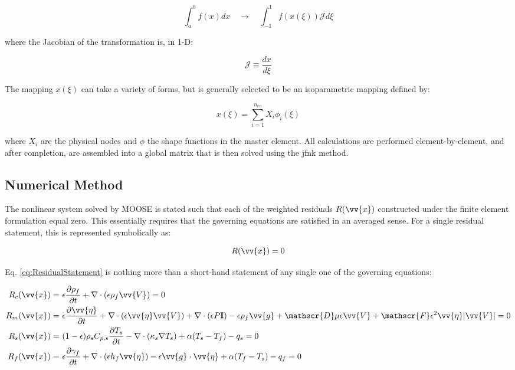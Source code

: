 \documentclass[10pt]{article}
\newcommand{\massconservationnlv}{\epsilon\frac{\partial\rho_f}{\partial t} + \nabla\cdot(\epsilon\rho_f\vv{V})=0}
\newcommand{\momentumconservationnlv}{\epsilon\frac{\partial\vv{\eta}}{\partial t}+\nabla\cdot(\epsilon\vv{\eta}\vv{V})+\nabla\cdot(\epsilon P\textbf{I})-\epsilon\rho_f\vv{g}+\mathscr{D}\mu\epsilon\vv{V}+\mathscr{F}\epsilon^2\vv{\eta}|\vv{V}|=0}
\newcommand{\fluidenergyconservationnlv}{\epsilon\frac{\partial \gamma_f}{\partial t}+\nabla\cdot(\epsilon h_f\vv{\eta})-\epsilon\vv{g}\cdot\vv{\eta}+\alpha(T_f-T_s)-q_f=0}
\newcommand{\solidenergyconservationnlv}{(1-\epsilon)\rho_sC_{p,s}\frac{\partial T_s}{\partial t}-\nabla\cdot(\kappa_s\nabla T_s)+\alpha(T_s-T_f)-q_s=0}
\numberwithin{equation}{section} %
\begin{document}
\begin{equation}
\int_{a}^{b}f(x)dx\quad\rightarrow\quad\int_{-1}^{1}f(x(\xi))\mathscr{J}d\xi
\end{equation}

where the Jacobian of the transformation is, in 1-D:

\begin{equation}
\mathscr{J}\equiv\frac{dx}{d\xi}
\end{equation}

The mapping \(x(\xi)\) can take a variety of forms, but is generally selected to be an isoparametric mapping defined by:

\begin{equation}
x(\xi)=\sum_{i=1}^{n_{en}}X_i\phi_i(\xi)
\end{equation}

where \(X_i\) are the physical nodes and \(\phi\) the shape functions in the master element. All calculations are performed element-by-element, and after completion, are assembled into a global matrix that is then solved using the \gls{jfnk} method.

\subsection{Numerical Method}
\label{sec:NumericalMethod}

The nonlinear system solved by MOOSE is stated such that each of the weighted residuals \(R(\vv{x})\) constructed under the finite element formulation equal zero. This essentially requires that the governing equations are satisfied in an averaged sense. For a single residual statement, this is represented symbolically as:

\begin{equation}
\label{eq:ResidualStatement}
R(\vv{x})=0
\end{equation}

Eq. \eqref{eq:ResidualStatement} is nothing more than a short-hand statement of any single one of the governing equations:

\begin{equation}
\label{eq:residuals}
\begin{aligned}
R_c(\vv{x})=&\ \massconservationnlv\\
R_m(\vv{x})=&\ \momentumconservationnlv\\
R_s(\vv{x})=&\ \solidenergyconservationnlv\\
R_f(\vv{x})=&\ \fluidenergyconservationnlv\\
\end{aligned}
\end{equation}
\end{document}
